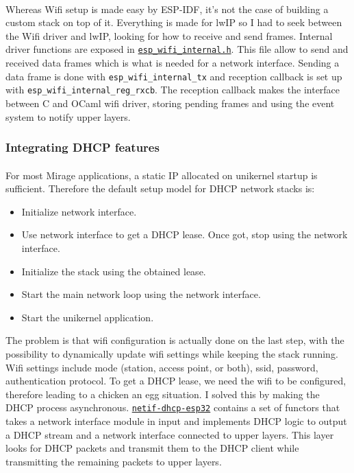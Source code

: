 \documentclass[a4paper]{article}
\begin{document}
\paragraph{}
Whereas Wifi setup is made easy by ESP-IDF, it's not the case of building a custom stack on top of it. Everything is made for lwIP so I had to seek between the Wifi driver and lwIP, looking for how to receive and send frames. Internal driver functions are exposed in \href{https://github.com/espressif/esp-idf/blob/master/components/esp32/include/esp_wifi_internal.h}{\texttt{esp\_wifi\_internal.h}}. This file allow to send and received data frames which is what is needed for a network interface. Sending a data frame is done with \texttt{esp\_wifi\_internal\_tx} and reception callback is set up with \texttt{esp\_wifi\_internal\_reg\_rxcb}.
The reception callback makes the interface between C and OCaml wifi driver, storing pending frames and using the event system to notify upper layers. 

\subsubsection{Integrating DHCP features}
\paragraph{}
For most Mirage applications, a static IP allocated on unikernel startup is sufficient. Therefore the default setup model for DHCP network stacks is:
\begin{itemize}[itemsep=0pt,parsep=0pt]
\item Initialize network interface.
\item Use network interface to get a DHCP lease. Once got, stop using the network interface.
\item Initialize the stack using the obtained lease.
\item Start the main network loop using the network interface. 
\item Start the unikernel application.
\end{itemize}
The problem is that wifi configuration is actually done on the last step, with the possibility to dynamically update wifi settings while keeping the stack running. Wifi settings include mode (station, access point, or both), ssid, password, authentication protocol. To get a DHCP lease, we need the wifi to be configured, therefore leading to a chicken an egg situation. I solved this by making the DHCP process asynchronous. \href{https://github.com/well-typed-lightbulbs/netif-dhcp-esp32}{\texttt{netif-dhcp-esp32}} contains a set of functors that takes a network interface module in input and implements DHCP logic to output a DHCP stream and a network interface connected to upper layers. This layer looks for DHCP packets and transmit them to the DHCP client while transmitting the remaining packets to upper layers.
\end{document}
